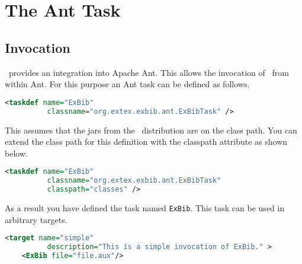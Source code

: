 
\section{The \ExBib{} Ant Task}%

\subsection{Invocation}

\ExBib\ provides an integration into Apache Ant. This allows the
invocation of \ExBib\ from within Ant. For this purpose an Ant task
can be defined as follows.

\begin{lstlisting}[language=XML,morekeywords={taskdef}]
 <taskdef name="ExBib"
          classname="org.extex.exbib.ant.ExBibTask" />
\end{lstlisting}

This assumes that the jars from the \ExBib\ distribution are on the
class path. You can extend the class path for this definition with the
classpath attribute as shown below.

\begin{lstlisting}[language=XML,morekeywords={taskdef}]
 <taskdef name="ExBib"
          classname="org.extex.exbib.ant.ExBibTask"
          classpath="classes" />
\end{lstlisting}

As a result you have defined the task named \texttt{ExBib}. This task
can be used in arbitrary targets.

\begin{lstlisting}[language=XML,morekeywords={target}]
  <target name="simple"
          description="This is a simple invocation of ExBib." >
    <ExBib file="file.aux"/>
\end{lstlisting}

